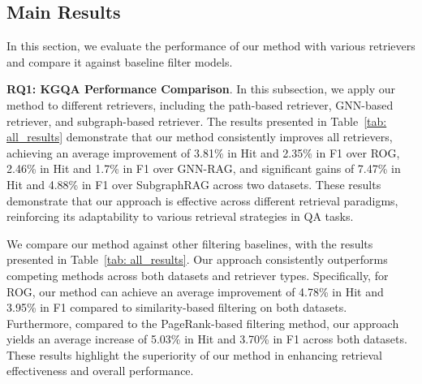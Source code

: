 \documentclass[11pt]{article}
\begin{document}
\subsection{Main Results}
In this section, we evaluate the performance of our method with various retrievers and compare it against baseline filter models.


\noindent \textbf{RQ1: KGQA Performance Comparison}.
In this subsection, we apply our method to different retrievers, including the path-based retriever, GNN-based retriever, and subgraph-based retriever. The results presented in Table~\ref{tab: all_results} demonstrate that our method consistently improves all retrievers, achieving an average improvement of 3.81\% in Hit and 2.35\% in F1 over ROG, 2.46\% in Hit and 1.7\% in F1 over GNN-RAG, and significant gains of 7.47\% in Hit and 4.88\% in F1 over SubgraphRAG across two datasets.
These results demonstrate that our approach is effective across different retrieval paradigms, reinforcing its adaptability to various retrieval strategies in QA tasks.


We compare our method against other filtering baselines, with the results presented in Table~\ref{tab: all_results}. Our approach consistently outperforms competing methods across both datasets and retriever types. Specifically, for ROG, our method can achieve an average improvement of 4.78\% in Hit and 3.95\% in F1 compared to similarity-based filtering on both datasets. Furthermore, compared to the PageRank-based filtering method, our approach yields an average increase of 5.03\% in Hit and 3.70\% in F1 across both datasets. These results highlight the superiority of our method in enhancing retrieval effectiveness and overall performance.
\end{document}
